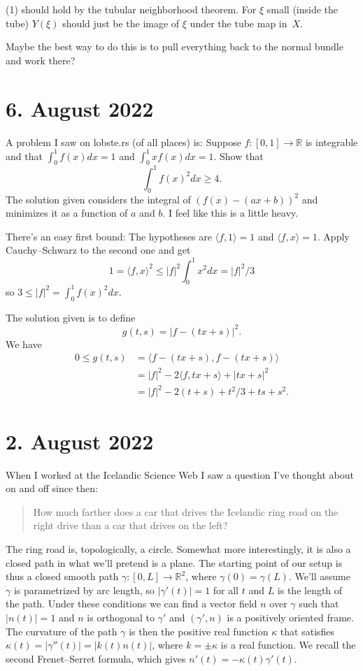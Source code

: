 \documentclass[11pt]{amsart}
\theoremstyle{definition}
\newcommand{\kk}[1]{\mathbb{#1}}
\begin{document}
(1) should hold by the tubular neighborhood theorem.
For $\xi$ small (inside the tube) $Y(\xi)$ should just be the image of $\xi$
under the tube map in~$X$.

Maybe the best way to do this is to pull everything back to the normal bundle
and work there?



\section*{6. August 2022}

A problem I saw on lobste.rs (of all places) is:
Suppose $f : [0,1] \to \kk R$ is integrable and that
$\int_0^1 f(x) dx = 1$ and $\int_0^1 xf(x) dx = 1$.
Show that
$$
\int_0^1 f(x)^2 dx \geq 4.
$$
The solution given considers the integral of $(f(x) - (ax + b))^2$ and minimizes
it as a function of $a$ and $b$.
I feel like this is a little heavy.

There's an easy first bound:
The hypotheses are $\langle f, 1 \rangle = 1$ and $\langle f, x \rangle = 1$.
Apply Cauchy--Schwarz to the second one and get
\[
1
= \langle f, x \rangle^2
\leq |f|^2 \int_0^1 x^2 dx
= |f|^2 / 3
\]
so $3 \leq |f|^2 = \int_0^1 f(x)^2 dx$.

The solution given is to define
$$
g(t,s) =
|f - (tx + s)|^2.
$$
We have
\begin{align*}
0 \leq g(t,s)
&= \langle f - (tx + s), f - (tx + s) \rangle
\\
&= |f|^2 - 2 \langle f, tx + s \rangle + |tx + s|^2
\\
&= |f|^2 - 2(t + s) + t^2/3 + ts + s^2.
\end{align*}





\section*{2. August 2022}

When I worked at the Icelandic Science Web I saw a question I've thought about
on and off since then:

\begin{quote}
How much farther does a car that drives the Icelandic ring road on the right
drive than a car that drives on the left?
\end{quote}

The ring road is, topologically, a circle.
Somewhat more interestingly, it is also a closed path in what we'll pretend is
a plane.
The starting point of our setup is thus a closed smooth path $\gamma : [0,L] \to
\kk R^2$, where $\gamma(0) = \gamma(L)$.
We'll assume $\gamma$ is parametrized by arc length, so $|\gamma'(t)| = 1$ for
all $t$ and $L$ is the length of the path.
Under these conditions we can find a vector field $n$ over $\gamma$ such that $|n(t)| = 1$
and $n$ is orthogonal to $\gamma'$ and $(\gamma', n)$ is a positively oriented
frame.
The curvature of the path $\gamma$ is then the positive real function $\kappa$ that
satisfies
$\kappa(t) = |\gamma''(t)| = |k(t) n(t)|$,
where $k = \pm \kappa$ is a real function.
We recall the second Frenet--Serret formula, which gives $n'(t) = -\kappa(t)
\gamma'(t)$.
\end{document}
